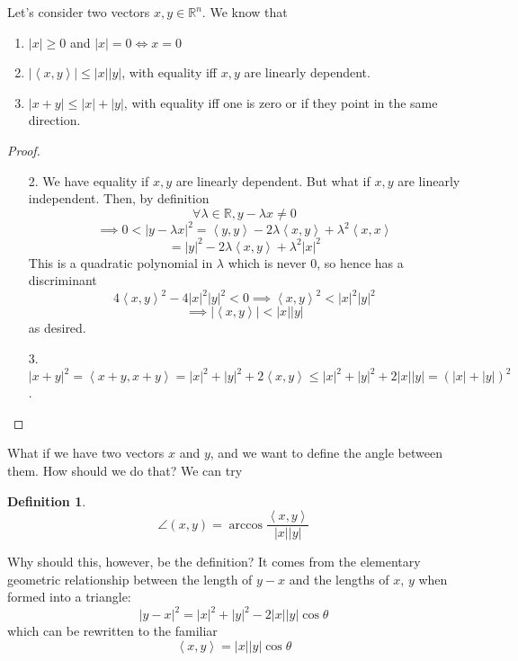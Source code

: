 \documentclass{article}
\newtheorem{definition}{Definition}
\newcommand{\reals}[0]{\mathbb{R}}
\newcommand{\ip}[2]{\left\langle#1,#2\right\rangle}
\begin{document}
Let's consider two vectors \(x, y \in \reals^n\). We know that
\begin{enumerate}
  \item \(|x| \geq 0\) and \(|x| = 0 \iff x = 0\)
  \item \(|\ip{x}{y}| \leq |x||y|\), with equality iff \(x, y\) are linearly dependent.
  \item \(|x + y| \leq |x| + |y|\), with equality iff one is zero or if they point in the same direction.
\end{enumerate}
\begin{proof}
\begin{itemize}

  \item [2.] We have equality if \(x, y\) are linearly dependent. But what if \(x, y\) are linearly independent. Then, by definition
  \begin{equation}\forall \lambda \in \reals, y - \lambda x \neq 0\end{equation}
  \begin{equation}\implies 0 < |y - \lambda x|^2
  = \ip{y}{y} - 2\lambda\ip{x}{y} + \lambda^2\ip{x}{x}\end{equation}
  \begin{equation}= |y|^2 - 2\lambda\ip{x}{y} + \lambda^2|x|^2\end{equation}
  This is a quadratic polynomial in \(\lambda\) which is never 0, so hence has a discriminant
  \begin{equation}4\ip{x}{y}^2 - 4|x|^2|y|^2 < 0 \implies \ip{x}{y}^2 < |x|^2|y|^2\end{equation}
  \begin{equation}\implies |\ip{x}{y}| < |x||y|\end{equation}
  as desired.

  \item [3.] \(|x + y|^2  = \ip{x + y}{x + y} = |x|^2 + |y|^2 + 2\ip{x}{y}
  \leq |x|^2 + |y|^2 + 2|x||y| = (|x| + |y|)^2\).
\end{itemize}
\end{proof}

What if we have two vectors \(x\) and \(y\), and we want to define the angle between them. How should we do that? We can try

\begin{definition}
\begin{equation}\angle(x, y) = \arccos\frac{\ip{x}{y}}{|x||y|}\end{equation}
\end{definition}
Why should this, however, be the definition? It comes from the elementary geometric relationship between the length of \(y - x\) and the lengths of \(x\), \(y\) when formed into a triangle:
\begin{equation}|y - x|^2 = |x|^2 + |y|^2 - 2|x||y|\cos\theta\end{equation}
which can be rewritten to the familiar
\begin{equation}\ip{x}{y} = |x||y|\cos\theta\end{equation}
\end{document}
